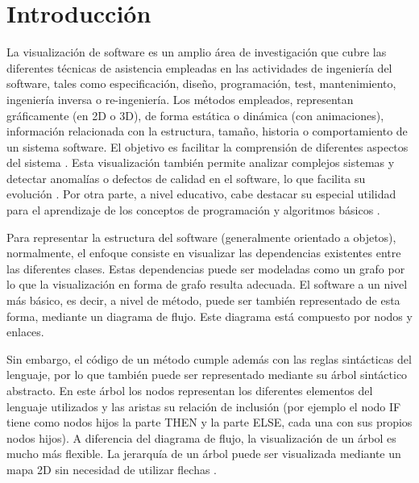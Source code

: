 \documentclass{llncs}
\begin{document}
\section{Introducción}
\label{sec:intro}
La visualización de software es un amplio área de investigación que cubre las diferentes técnicas de asistencia empleadas en las actividades de ingeniería del software, tales como especificación, diseño, programación, test, mantenimiento, ingeniería inversa o re-ingeniería. Los métodos empleados, representan gráficamente (en 2D o 3D), de forma estática o dinámica (con animaciones), información relacionada con la estructura, tamaño, historia o comportamiento de un sistema software. El objetivo es facilitar la comprensión de diferentes aspectos del sistema \cite{baecker1988enhancing}. Esta visualización también permite analizar complejos sistemas y detectar anomalías o defectos de calidad en el software, lo que facilita su evolución \cite{softwarevisualization}. Por otra parte, a nivel educativo, cabe destacar su especial utilidad para el aprendizaje de los conceptos de programación y algoritmos básicos \cite{urquiza2009survey}.

Para representar la estructura del software (generalmente orientado a objetos), normalmente, el enfoque consiste en visualizar las dependencias existentes entre las diferentes clases. Estas dependencias puede ser modeladas como un grafo por lo que la visualización en forma de grafo resulta adecuada. El software a un nivel más básico, es decir, a nivel de método, puede ser también representado de esta forma, mediante un diagrama de flujo. Este diagrama está compuesto por nodos y enlaces.

Sin embargo, el código de un método cumple además con las reglas sintácticas del lenguaje, por lo que también puede ser representado mediante su árbol sintáctico abstracto. En este árbol los nodos representan los diferentes elementos del lenguaje utilizados y las aristas su relación de inclusión (por ejemplo el nodo IF tiene como nodos hijos la parte THEN y la parte ELSE, cada una con sus propios nodos hijos). A diferencia del diagrama de flujo, la visualización de un árbol es mucho más flexible. La jerarquía de un árbol puede ser visualizada mediante un mapa 2D sin necesidad de utilizar flechas \cite{softwarevisualization}.
\end{document}
